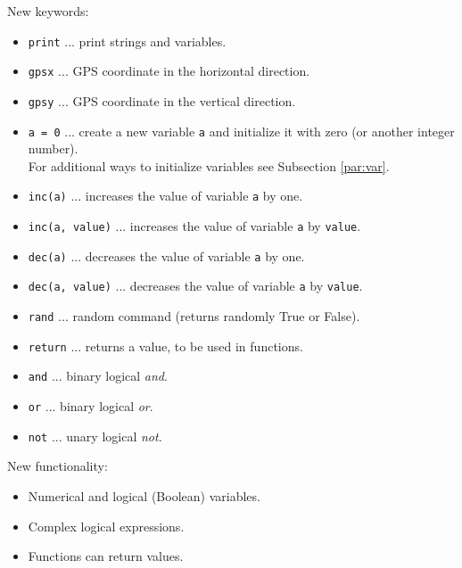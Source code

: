 New keywords:
\begin{itemize}
\item {\tt print} ... print strings and variables.
\item {\tt gpsx} ... GPS coordinate in the horizontal direction.
\item {\tt gpsy} ... GPS coordinate in the vertical direction.
\item {\tt a = 0} ... create a new variable {\tt a} and initialize it with zero (or another 
      integer number).\\ For additional ways to initialize variables see Subsection \ref{par:var}.
\item {\tt inc(a)} ... increases the value of variable {\tt a} by one.
\item {\tt inc(a, value)} ... increases the value of variable {\tt a} by {\tt value}.
\item {\tt dec(a)} ... decreases the value of variable {\tt a} by one.
\item {\tt dec(a, value)} ... decreases the value of variable {\tt a} by {\tt value}.
\item {\tt rand} ... random command (returns randomly True or False).
\item {\tt return} ... returns a value, to be used in functions.
\item {\tt and} ... binary logical {\em and}.
\item {\tt or} ... binary logical {\em or}.
\item {\tt not} ... unary logical {\em not}.
\end{itemize}
New functionality:
\begin{itemize}
\item Numerical and logical (Boolean) variables.
\item Complex logical expressions.
\item Functions can return values.
\end{itemize}
